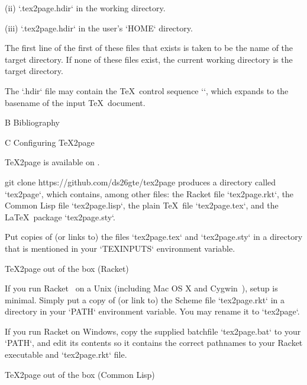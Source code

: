 \item(ii) `.tex2page.hdir` in the working directory.

\item(iii) `.tex2page.hdir` in the user’s `HOME` directory.

\n The first line of the first of these files that exists
is taken to be the name of the target directory.  If none of
these files exist, the current working directory is the target
directory.

The `.hdir` file may contain the \TeX\ control
sequence `\jobname`, which expands to the basename of
the input \TeX\ document.

\beginchapter  B Bibliography





\ifx\inpltdist\Undefined

\beginchapter  C Configuring \TeX2page

%
\TeX2page is available on
.

\begintt
git clone https://github.com/ds26gte/tex2page
\endtt
%
produces a directory
called `tex2page`, which contains, among other files:
the Racket file `tex2page.rkt`, the Common Lisp file `tex2page.lisp`, the plain \TeX\ file
`tex2page.tex`, and the \LaTeX\ package
`tex2page.sty`.

Put copies of (or links to) the files
`tex2page.tex` and `tex2page.sty`  in a directory
that is mentioned in your `TEXINPUTS` environment
variable.

\beginsection \TeX2page out of the box (Racket)

%
If you run Racket~\cite{racket} on a Unix (including Mac OS X and
Cygwin~\cite{cygwin}), setup is minimal.  Simply put a copy of (or link to) the Scheme
file `tex2page.rkt` in a directory in your `PATH` environment
variable. You may rename it to `tex2page`.

If you run Racket on Windows,
copy the supplied batchfile `tex2page.bat`
to your `PATH`, and edit its contents so it contains
the correct pathnames to your Racket executable and
`tex2page.rkt` file.


\beginsection \TeX2page out of the box (Common Lisp)

